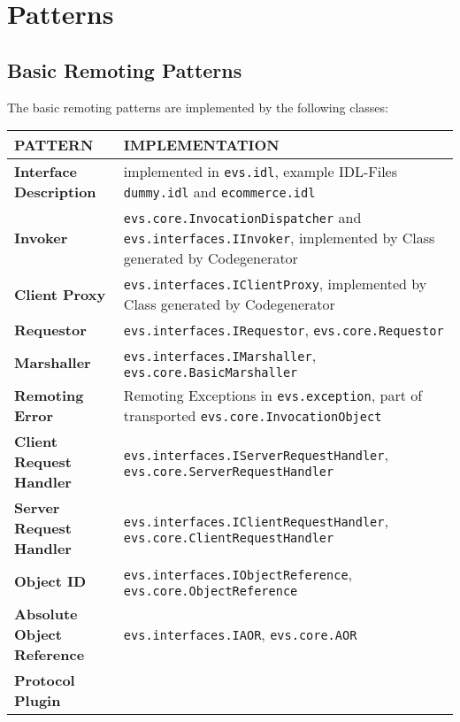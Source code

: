 \documentclass[a4paper]{article}
\begin{document}
\pagestyle{empty}
\section*{Patterns}
\vspace{0.5cm}
\subsection*{Basic Remoting Patterns}
The basic remoting patterns are implemented by the following classes:\\

\begin{small}
\begin{tabular}{| p{4cm} | p{9cm} |}\hline
\textbf{PATTERN} & \textbf{IMPLEMENTATION}\\\hline\hline
\textbf{Interface Description} & implemented in \texttt{evs.idl}, example IDL-Files \texttt{dummy.idl} and \texttt{ecommerce.idl} \\\hline
\textbf{Invoker} & \texttt{evs.core.InvocationDispatcher} and \texttt{evs.interfaces.IInvoker}, implemented by Class generated by Codegenerator\\\hline
\textbf{Client Proxy} & \texttt{evs.interfaces.IClientProxy}, implemented by Class generated by Codegenerator\\\hline
\textbf{Requestor} & \texttt{evs.interfaces.IRequestor}, \texttt{evs.core.Requestor}\\\hline
\textbf{Marshaller} & \texttt{evs.interfaces.IMarshaller}, \texttt{evs.core.BasicMarshaller}\\\hline
\textbf{Remoting Error} & Remoting Exceptions in \texttt{evs.exception}, part of transported \texttt{evs.core.InvocationObject}\\\hline
\textbf{Client Request Handler} & \texttt{evs.interfaces.IServerRequestHandler}, \texttt{evs.core.ServerRequestHandler}\\\hline
\textbf{Server Request Handler} & \texttt{evs.interfaces.IClientRequestHandler}, \texttt{evs.core.ClientRequestHandler}\\\hline
\textbf{Object ID} & \texttt{evs.interfaces.IObjectReference}, \texttt{evs.core.ObjectReference}\\\hline
\textbf{Absolute Object Reference} & \texttt{evs.interfaces.IAOR}, \texttt{evs.core.AOR}\\\hline
\textbf{Protocol Plugin} & \\\hline
\end{tabular}
\end{small}
\end{document}
